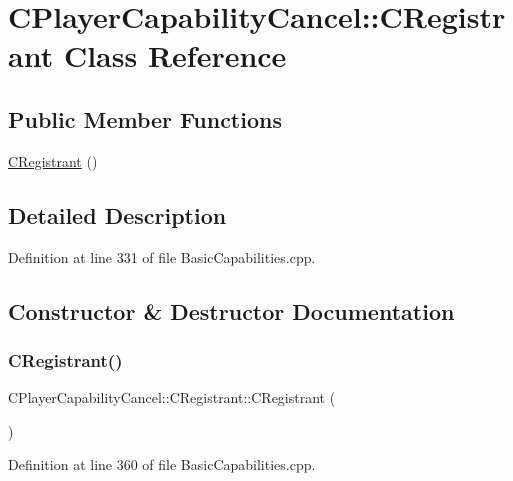 \hypertarget{classCPlayerCapabilityCancel_1_1CRegistrant}{}\section{C\+Player\+Capability\+Cancel\+:\+:C\+Registrant Class Reference}
\label{classCPlayerCapabilityCancel_1_1CRegistrant}
\subsection*{Public Member Functions}
\begin{DoxyCompactItemize}
\item 
\hyperlink{classCPlayerCapabilityCancel_1_1CRegistrant_a78f5bc9125ca55fc86efdabf1faaa363}{C\+Registrant} ()
\end{DoxyCompactItemize}


\subsection{Detailed Description}


Definition at line 331 of file Basic\+Capabilities.\+cpp.



\subsection{Constructor \& Destructor Documentation}
\hypertarget{classCPlayerCapabilityCancel_1_1CRegistrant_a78f5bc9125ca55fc86efdabf1faaa363}{}\label{classCPlayerCapabilityCancel_1_1CRegistrant_a78f5bc9125ca55fc86efdabf1faaa363} 
\subsubsection{\texorpdfstring{C\+Registrant()}{CRegistrant()}}
{\footnotesize\ttfamily C\+Player\+Capability\+Cancel\+::\+C\+Registrant\+::\+C\+Registrant (\begin{DoxyParamCaption}{ }\end{DoxyParamCaption})}



Definition at line 360 of file Basic\+Capabilities.\+cpp.


